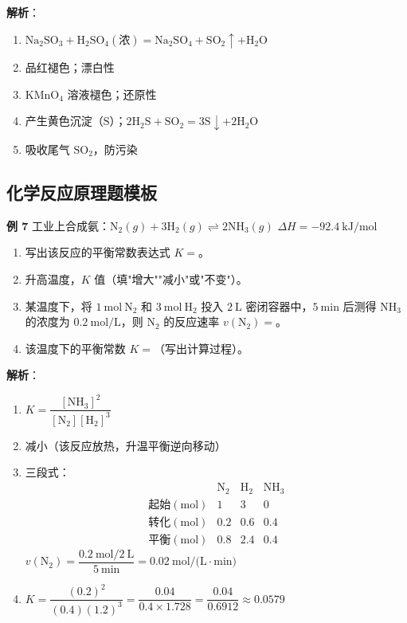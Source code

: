 \textbf{解析}：
\begin{enumerate}
  \item $\text{Na}_2\text{SO}_3 + \text{H}_2\text{SO}_4(\text{浓}) = \text{Na}_2\text{SO}_4 + \text{SO}_2\uparrow + \text{H}_2\text{O}$
  \item 品红褪色；漂白性
  \item $\text{KMnO}_4$ 溶液褪色；还原性
  \item 产生黄色沉淀（$\text{S}$）；$2\text{H}_2\text{S} + \text{SO}_2 = 3\text{S}\downarrow + 2\text{H}_2\text{O}$
  \item 吸收尾气 $\text{SO}_2$，防污染
\end{enumerate}

\subsection{化学反应原理题模板}

\textbf{例 7} 工业上合成氨：$\text{N}_2(g) + 3\text{H}_2(g) \rightleftharpoons 2\text{NH}_3(g)$ $\Delta H = -92.4\ \text{kJ/mol}$

\begin{enumerate}
  \item 写出该反应的平衡常数表达式 $K =$\underline{\qquad\qquad}。
  \item 升高温度，$K$ 值\underline{\qquad\qquad}（填"增大""减小"或"不变"）。
  \item 某温度下，将 $1\ \text{mol}\ \text{N}_2$ 和 $3\ \text{mol}\ \text{H}_2$ 投入 $2\ \text{L}$ 密闭容器中，$5\ \text{min}$ 后测得 $\text{NH}_3$ 的浓度为 $0.2\ \text{mol/L}$，则 $\text{N}_2$ 的反应速率 $v(\text{N}_2) =$\underline{\qquad\qquad}。
  \item 该温度下的平衡常数 $K =$\underline{\qquad\qquad}（写出计算过程）。
\end{enumerate}

\textbf{解析}：
\begin{enumerate}
  \item $K = \dfrac{[\text{NH}_3]^2}{[\text{N}_2][\text{H}_2]^3}$
  \item 减小（该反应放热，升温平衡逆向移动）
  \item 三段式：
  \[
  \begin{array}{c|ccc}
   & \text{N}_2 & \text{H}_2 & \text{NH}_3 \\ \hline
  起始(\text{mol}) & 1 & 3 & 0 \\
  转化(\text{mol}) & 0.2 & 0.6 & 0.4 \\
  平衡(\text{mol}) & 0.8 & 2.4 & 0.4
  \end{array}
  \]
  $v(\text{N}_2) = \dfrac{0.2\ \text{mol} / 2\ \text{L}}{5\ \text{min}} = 0.02\ \text{mol/(L}\cdot\text{min)}$
  \item $K = \dfrac{(0.2)^2}{(0.4)(1.2)^3} = \dfrac{0.04}{0.4\times1.728} = \dfrac{0.04}{0.6912} \approx 0.0579$
\end{enumerate}

